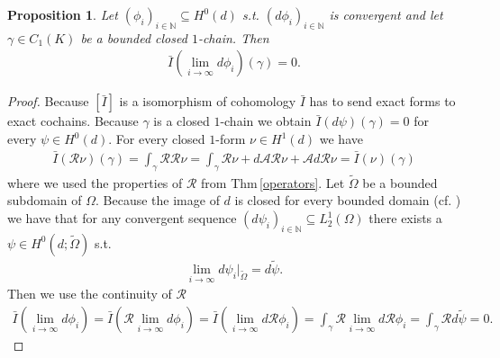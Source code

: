 \documentclass[12pt,a4paper]{article}
\newtheorem{proposition}{Proposition}
\theoremstyle{definition}
\newcommand{\aop}{\mathscr{A}}
\newcommand{\rop}{\mathscr{R}} %
\begin{document}
\begin{proposition}\label{integral_exact_form_zero}
    Let $(\phi_i)_{i\in\mathbb{N}} \subseteq H^0(d)$ s.t. 
    $(d\phi_i)_{i\in\mathbb{N}}$ 
    is convergent and let $\gamma \in C_1(K)$ be a bounded closed $1$-chain.
    Then
    \begin{align*}
        \bar{I}(\lim\limits_{i \rightarrow \infty}d\phi_i)(\gamma) = 0.
    \end{align*}
\end{proposition}
\begin{proof}
    
    Because 
    $[\bar{I}]$ is a isomorphism of cohomology $\bar{I}$ has to send 
    exact forms to exact cochains. Because $\gamma$ is a closed $1$-chain 
    we obtain $\bar{I}(d\psi)(\gamma) = 0$ for every $\psi \in H^0(d)$.
    For every closed $1$-form $\nu \in H^1(d)$ we have 
    \begin{align*}
        \bar{I}(\rop \nu)(\gamma) = \int_\gamma \rop \rop \nu 
        = \int_\gamma \rop \nu + d\aop\rop\nu + \aop d\rop \nu 
        = \bar{I}(\nu)(\gamma)
    \end{align*}
    where we used the properties of $\rop$ from Thm\,\ref{operators}. 
    Let $\tilde{\Omega}$ be a bounded
    subdomain of $\Omega$.
    Because the image of $d$ is closed for every bounded domain 
    (cf. \cite[Lemma 7]{picard}) we have that for any convergent sequence 
    $(d\psi_i)_{i\in \mathbb{N}} \subseteq L^1_2(\Omega)$ 
    there exists a $\psi \in H^0(d;\tilde{\Omega})$ s.t.
    \begin{align*}
        \lim\limits_{i \rightarrow \infty}d\psi_i| _{\tilde{\Omega}} 
        = d\tilde{\psi}.
    \end{align*}
    Then we use the continuity of $\rop$
    \begin{align*}
        \bar{I}(\lim\limits_{i \rightarrow \infty}d\phi_i) =
        \bar{I}(\rop \lim\limits_{i \rightarrow \infty}d\phi_i) = 
        \bar{I}(\lim\limits_{i \rightarrow \infty}d\rop \phi_i) =
        \int_\gamma \rop \lim\limits_{i \rightarrow \infty}d\rop \phi_i =
        \int_\gamma \rop d\tilde{\psi} = 0.
    \end{align*}
\end{proof}
\end{document}
